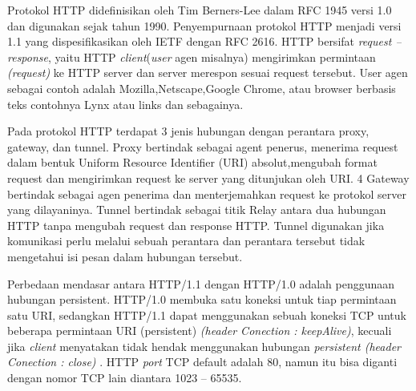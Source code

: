 \begin{enumerate}
\par Protokol HTTP didefinisikan oleh Tim Berners-Lee dalam RFC
1945 versi 1.0 dan digunakan sejak tahun 1990. Penyempurnaan protokol HTTP menjadi versi 1.1 yang dispesifikasikan oleh IETF dengan RFC 2616. HTTP bersifat \textit{request – response}, yaitu HTTP \textit{client}(\textit{user} agen misalnya) mengirimkan permintaan \textit{(request)} ke HTTP server dan server merespon sesuai request tersebut. User agen sebagai contoh adalah Mozilla,Netscape,Google Chrome, atau browser berbasis teks contohnya Lynx atau links dan sebagainya. 
\par Pada protokol HTTP terdapat 3 jenis hubungan dengan perantara
proxy, gateway, dan tunnel. Proxy bertindak sebagai agent penerus,
menerima request dalam bentuk Uniform Resource Identifier (URI) absolut,mengubah format request dan mengirimkan request ke server yang ditunjukan oleh URI. 4 Gateway bertindak sebagai agen penerima dan menterjemahkan request ke protokol server yang dilayaninya. Tunnel bertindak sebagai titik Relay antara dua hubungan HTTP tanpa mengubah request dan response HTTP. Tunnel digunakan jika komunikasi perlu melalui sebuah perantara dan perantara tersebut tidak mengetahui isi pesan dalam hubungan tersebut. 
\par Perbedaan mendasar antara HTTP/1.1 dengan HTTP/1.0 adalah
penggunaan hubungan persistent. HTTP/1.0 membuka satu koneksi untuk tiap permintaan satu URI, sedangkan HTTP/1.1 dapat menggunakan sebuah koneksi TCP untuk beberapa permintaan URI (persistent) \textit{(header Conection : keepAlive)}, kecuali jika \textit{client} menyatakan tidak hendak menggunakan hubungan \textit{persistent (header Conection : close)} . HTTP \textit{port} TCP default adalah 80, namun itu bisa diganti dengan nomor TCP lain diantara 1023 – 65535.


\end{enumerate}
